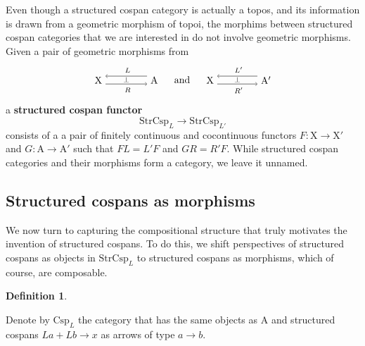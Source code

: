 \documentclass{amsart}
\newcommand{\A}{\cat{A}}
\newcommand{\X}{\cat{X}}
\newcommand{\Csp}{\cat{Csp}}
\newcommand{\StrCsp}{\cat{StrCsp}}
\newcommand{\defn}[1]{\textbf{#1}}
\newcommand{\cat}[1]{\mathrm{#1}}
\renewcommand{\t}[1]{\text{#1}}
\newcommand{\from}{\colon}
\newcommand{\csp}[3]{#1 + #3 \to #2}
\theoremstyle{remark}
\theoremstyle{definition}
\newtheorem{definition}[theorem]{Definition}
\newcommand{\adjunction}[4]{%
  \begin{tikzpicture}[baseline=-3pt]
    \node (1) at (0,0) {\( #1 \)};
    \node (2) at (2,0) {\( #4 \)};
    \draw [->]
      ([yshift= 4pt]2.west) to
      node [above] {\scriptsize{ $ #2 $ }}
      ([yshift= 4pt]1.east);
    \draw [->]
      ([yshift= -4pt]1.east) to
      node [below] {\scriptsize{ $ #3 $ }}
      node [above,yshift= -1.5pt] {\scriptsize{$ \perp $}}
      ([yshift= -4pt]2.west);
  \end{tikzpicture}
%
}
\begin{document}
Even though a structured cospan category is actually a topos, and its
information is drawn from a geometric morphism of topoi, the morphims
between structured cospan categories that we are interested in do not
involve geometric morphisms. Given a pair of geometric morphisms from
%
\[
  \adjunction{\X}{L}{R}{\A}
  \quad
  \t{ and }
  \quad
  \adjunction{\X}{L'}{R'}{\A'}
\]
% 
a \defn{structured cospan functor}
%
\[
  \StrCsp_{L} \to \StrCsp_{L'}
\]
% 
consists of a a pair of finitely continuous and cocontinuous functors
%
%
$ F \from \X \to \X' $ and $ G \from \A \to \A' $ such that
$ FL=L'F $ and $ GR = R'F $.  While structured cospan categories and
their morphisms form a category, we leave it unnamed.


\subsection{Structured cospans as morphisms}
\label{sec:strcsp-as-arrows}

We now turn to capturing the compositional structure that
truly motivates the invention of structured cospans.  To do this, we
shift perspectives of structured cospans as objects in $ \StrCsp_{L} $
to structured cospans as morphisms, which of course, are composable. 

\begin{definition} \label{def:strcsp-arr}
  
  Denote by $ \Csp_{L} $ the category that has the same objects as
  $ \A $ and structured cospans $ \csp{La}{x}{Lb} $ as arrows of
  type $ a \to b $.
  
\end{definition}
\end{document}
